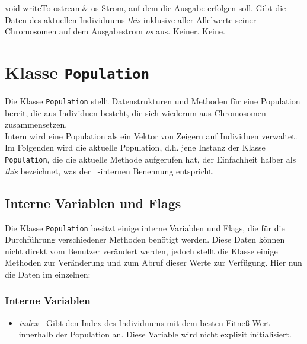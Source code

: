 \documentclass{report}
\begin{document}
\setConstInstance
\printMethodWithOneParam
{void}
{writeTo}
{ostream\&}
{os}
{Strom, auf dem die Ausgabe erfolgen soll.}
{Gibt die Daten des aktuellen Individuums {\em this} inklusive aller 
 Allelwerte seiner Chromosomen auf dem Ausgabestrom {\em os} aus.}
{Keiner.}
{Keine.}

\setNormalInstance

\noindent
\chapter{Klasse {\tt Population}}
Die Klasse {\tt Population} stellt Datenstrukturen und Methoden f\"ur 
eine Population bereit, die aus Individuen besteht, die sich
wiederum aus Chromosomen zusammensetzen.\\
Intern wird eine
Population als ein Vektor von Zeigern auf Individuen verwaltet.\\
Im Folgenden wird die aktuelle Population, d.h. jene Instanz der Klasse
{\tt Population}, die die aktuelle Methode aufgerufen hat, der Einfachheit 
halber als {\em this} bezeichnet, was der \cpp\ -internen Benennung
entspricht.

\section{Interne Variablen und Flags}
Die Klasse {\tt Population} besitzt einige interne Variablen und Flags,
die f\"ur die Durch\-f\"uhr\-ung verschiedener Methoden ben\"otigt werden.
Diese Daten k\"onnen nicht direkt vom Benutzer ver\"andert werden, jedoch
stellt die Klasse einige Methoden zur Ver\"anderung und zum Abruf dieser Werte
zur Verf\"ugung. Hier nun die Daten im einzelnen:\\

\subsection{Interne Variablen}
\begin{itemize}

\item {\em index} -
Gibt den Index des Individuums mit dem besten Fitne{\ss}-Wert innerhalb der
Population an. Diese Variable wird nicht explizit initialisiert.

\end{itemize}
\end{document}
